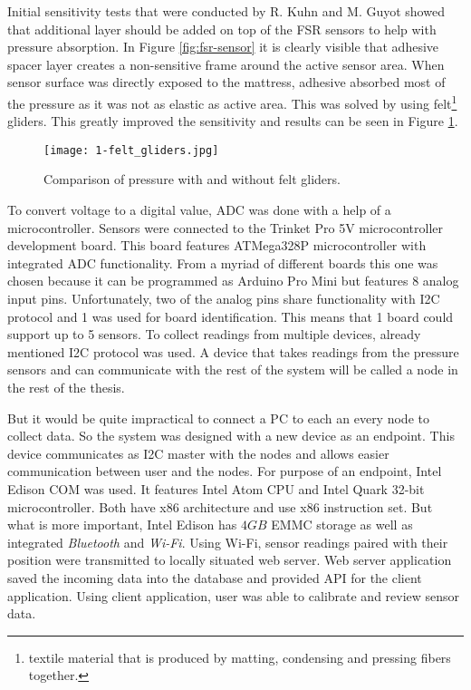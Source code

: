 Initial sensitivity tests that were conducted by R. Kuhn and M. Guyot showed that additional layer should be added on top of the \ac{FSR} sensors to help with pressure absorption. In Figure \ref{fig:fsr-sensor} it is clearly visible that adhesive spacer layer creates a non-sensitive frame around the active sensor area. When sensor surface was directly exposed to the mattress, adhesive absorbed most of the pressure as it was not as elastic as active area. This was solved by using felt\footnote{textile material that is produced by matting, condensing and pressing fibers together.} gliders. This greatly improved the sensitivity and results can be seen in Figure \ref{fig:felt_gliders}.

\begin{figure}[h]
  \begin{center}
    \texttt{[image: 1-felt\_gliders.jpg]}
  \end{center}
  \caption{Comparison of pressure with and without felt gliders.}
  \label{fig:felt_gliders}
\end{figure}

To convert voltage to a digital value, \ac{ADC} was done with a help of a microcontroller. Sensors were connected to the Trinket Pro 5V microcontroller development board\cite{Trinket}. This board features ATMega328P microcontroller with integrated \ac{ADC} functionality\cite{atmega328p}. From a myriad of different boards this one was chosen because it can be programmed as Arduino Pro Mini but features 8 analog input pins. Unfortunately, two of the analog pins share functionality with \ac{I2C} protocol and 1 was used for board identification. This means that 1 board could support up to 5 sensors. To collect readings from multiple devices, already mentioned \ac{I2C} protocol was used. A device that takes readings from the pressure sensors and can communicate with the rest of the system will be called a node in the rest of the thesis.

But it would be quite impractical to connect a \ac{PC} to each an every node to collect data. So the system was designed with a new device as an endpoint. This device communicates as \ac{I2C} master with the nodes and allows easier communication between user and the nodes. For purpose of an endpoint, Intel Edison \ac{COM} was used. It features Intel Atom \ac{CPU} and Intel Quark 32-bit microcontroller\cite{Edison}. Both have x86 architecture and use x86 instruction set. But what is more important, Intel Edison has $4GB$ \ac{EMMC} storage as well as integrated \textit{Bluetooth} and \textit{Wi-Fi}. Using Wi-Fi, sensor readings paired with their position were transmitted to locally situated web server. Web server application saved the incoming data into the database and provided \ac{API} for the client application. Using client application, user was able to calibrate and review sensor data.


